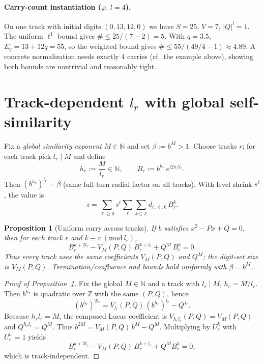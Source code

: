 \documentclass[11pt]{article}
\newtheorem{proposition}[theorem]{Proposition}
\theoremstyle{definition}
\theoremstyle{remark}
\newcommand{\Z}{\mathbb{Z}}
\newcommand{\N}{\mathbb{N}}
\begin{document}
\paragraph{Carry-count instantiation ($\varphi,\,l=4$).}
On one track with initial digits $(0,13,12,0)$ we have $S=25$, $V=7$, $|Q|^l=1$.
The uniform $\ell^1$ bound gives $\#\le 25/(7-2)=5$.
With $q=3.5$, $E_q=13+12q=55$, so the weighted bound gives $\#\le 55/(49/4-1)\approx 4.89$.
A concrete normalization needs exactly 4 carries (cf.\ the example above), showing both bounds are nontrivial and reasonably tight.

\section{Track-dependent $l_r$ with global self-similarity}\label{sec:selfsimilar}
Fix a \emph{global similarity exponent} $M\in\N$ and set $\beta:=b^{M}>1$. Choose tracks $r$; for each track pick $l_r\mid M$ and define
\[
h_r:=\frac{M}{l_r}\in\N,\qquad B_r:=b^{h_r}\,e^{i2\pi/l_r}.
\]
Then $(b^{h_r})^{l_r}=\beta$ (same full-turn radial factor on all tracks). With level shrink $s^\ell$, the value is
\[
z=\sum_{\ell\ge0}s^\ell \sum_{r}\sum_{k\in\Z} d_{r,\ell,k}\,B_r^{k}.
\]

\begin{proposition}[Uniform carry across tracks]\label{prop:uniform}
If $b$ satisfies $x^2-Px+Q=0$, then for each track $r$ and $k\equiv r\ (\mathrm{mod}\ l_r)$,
\begin{equation}\label{eq:uniform}
B_r^{k+2l_r}-V_{M}(P,Q)\,B_r^{k+l_r}+Q^{M}\,B_r^{k}=0.
\end{equation}
Thus every track uses the \emph{same} coefficients $V_{M}(P,Q)$ and $Q^{M}$; the digit-set size is $V_{M}(P,Q)$. Termination/confluence and bounds hold uniformly with $\beta=b^{M}$.
\end{proposition}

\begin{proof}[Proof of Proposition~\ref{prop:uniform}]
Fix the global $M\in\N$ and a track with $l_r\mid M$, $h_r=M/l_r$. Then $b^{h_r}$ is quadratic over $\Z$ with the same $(P,Q)$, hence
\[
(b^{h_r})^{2l_r} = V_{l_r}(P,Q)\,(b^{h_r})^{l_r} - Q^{\,l_r}.
\]
Because $h_r l_r=M$, the composed Lucas coefficient is $V_{h_r l_r}(P,Q)=V_M(P,Q)$ and $Q^{h_r l_r}=Q^{M}$. Thus
$b^{2M}=V_M(P,Q)\,b^{M}-Q^{M}$. Multiplying by $U_r^{k}$ with $U_r^{l_r}=1$ yields
\[
B_r^{k+2l_r} - V_M(P,Q)\,B_r^{k+l_r} + Q^{M}B_r^{k}=0,
\]
which is track‑independent.
\end{proof}
\end{document}
